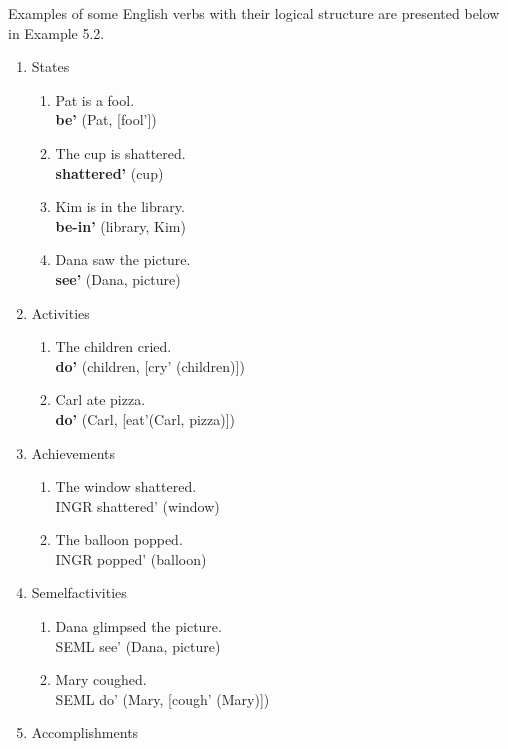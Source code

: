 Examples of some English verbs with their logical structure are presented below in Example 5.2. 


\begin{enumerate}
    \item States
     \begin{enumerate}
        \item Pat is a fool. \\
              \textbf{be'} (Pat, [fool'])
         \item The cup is shattered. \\
         \textbf{shattered'} (cup)
         \item Kim is in the library.\\ 
         \textbf{be-in'} (library, Kim)
         \item Dana saw the picture.\\ 
         \textbf{see'} (Dana, picture)
    \end{enumerate}
    \item Activities
     \begin{enumerate}
         \item The children cried. \\ 
         \textbf{do'} (children, [cry' (children)])
         \item Carl ate pizza. \\
         \textbf{do'} (Carl, [eat'(Carl, pizza)])
     \end{enumerate}
     \item Achievements
     \begin{enumerate}
         \item The window shattered. \\ 
         INGR shattered' (window)
         \item The balloon popped. \\ 
         INGR popped' (balloon)
     \end{enumerate}
     \item Semelfactivities
     \begin{enumerate}
         \item  Dana glimpsed the picture. \\
         SEML see' (Dana, picture)
         \item Mary coughed. \\
         SEML do' (Mary, [cough' (Mary)])
     \end{enumerate}
    \item Accomplishments
     \begin{enumerate}

\end{enumerate}
\end{enumerate}
